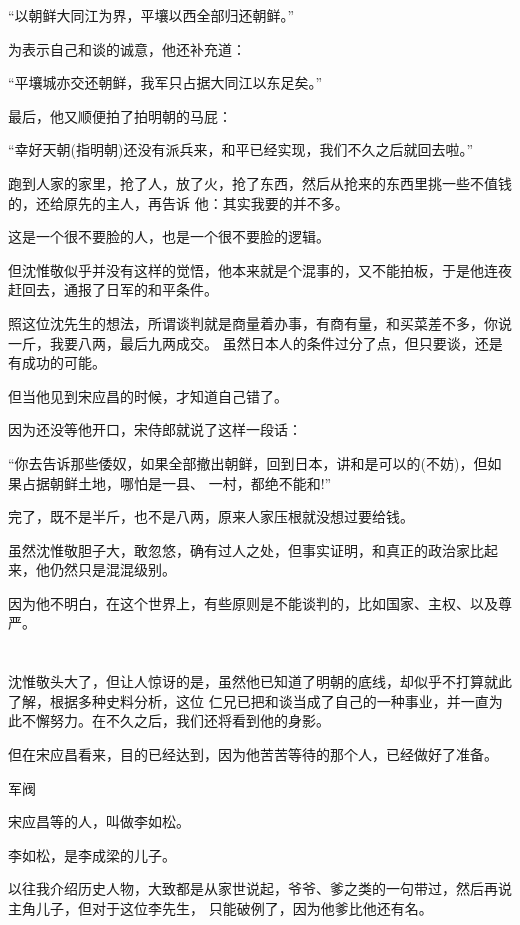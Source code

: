 \documentclass[11pt,a4paper,onecolumn]{article}
\begin{document}
``以朝鲜大同江为界，平壤以西全部归还朝鲜。''

为表示自己和谈的诚意，他还补充道：

``平壤城亦交还朝鲜，我军只占据大同江以东足矣。''

最后，他又顺便拍了拍明朝的马屁：

``幸好天朝(指明朝)还没有派兵来，和平已经实现，我们不久之后就回去啦。''

跑到人家的家里，抢了人，放了火，抢了东西，然后从抢来的东西里挑一些不值钱的，还给原先的主人，再告诉
他：其实我要的并不多。

这是一个很不要脸的人，也是一个很不要脸的逻辑。

但沈惟敬似乎并没有这样的觉悟，他本来就是个混事的，又不能拍板，于是他连夜赶回去，通报了日军的和平条件。

照这位沈先生的想法，所谓谈判就是商量着办事，有商有量，和买菜差不多，你说一斤，我要八两，最后九两成交。
虽然日本人的条件过分了点，但只要谈，还是有成功的可能。

但当他见到宋应昌的时候，才知道自己错了。

因为还没等他开口，宋侍郎就说了这样一段话：

``你去告诉那些倭奴，如果全部撤出朝鲜，回到日本，讲和是可以的(不妨)，但如果占据朝鲜土地，哪怕是一县、
一村，都绝不能和!''

完了，既不是半斤，也不是八两，原来人家压根就没想过要给钱。

虽然沈惟敬胆子大，敢忽悠，确有过人之处，但事实证明，和真正的政治家比起来，他仍然只是混混级别。

因为他不明白，在这个世界上，有些原则是不能谈判的，比如国家、主权、以及尊严。

\section[\thesection]{}

沈惟敬头大了，但让人惊讶的是，虽然他已知道了明朝的底线，却似乎不打算就此了解，根据多种史料分析，这位
仁兄已把和谈当成了自己的一种事业，并一直为此不懈努力。在不久之后，我们还将看到他的身影。

但在宋应昌看来，目的已经达到，因为他苦苦等待的那个人，已经做好了准备。

军阀

宋应昌等的人，叫做李如松。

李如松，是李成梁的儿子。

以往我介绍历史人物，大致都是从家世说起，爷爷、爹之类的一句带过，然后再说主角儿子，但对于这位李先生，
只能破例了，因为他爹比他还有名。
\end{document}
